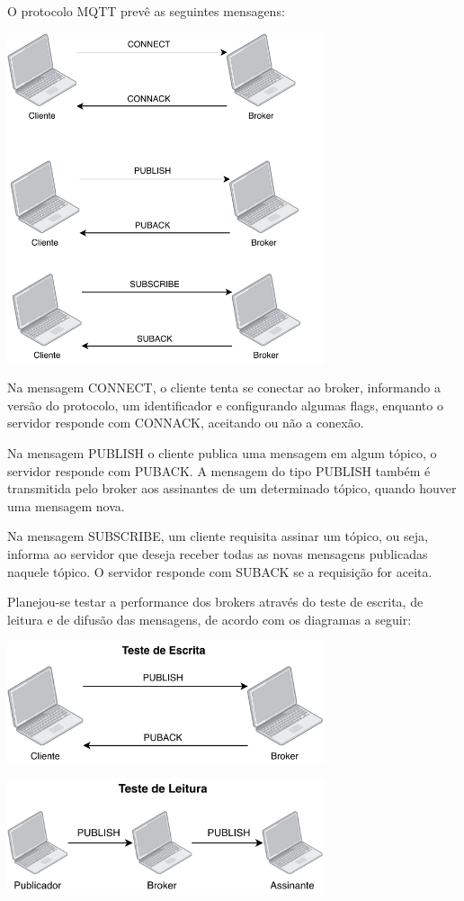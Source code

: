 \documentclass[12pt,a4paper]{article}
\begin{document}
O protocolo MQTT prevê as seguintes mensagens:
\begin{center}
\includegraphics[width=0.7\textwidth]{mqtt}
\end{center}

Na mensagem CONNECT, o cliente tenta se conectar ao broker, informando a versão do protocolo, um identificador e configurando algumas flags, enquanto o servidor responde com CONNACK, aceitando ou não a conexão.

Na mensagem PUBLISH o cliente publica uma mensagem em algum tópico, o servidor responde com PUBACK. A mensagem do tipo PUBLISH também é transmitida pelo broker aos assinantes de um determinado tópico, quando houver uma mensagem nova.

Na mensagem SUBSCRIBE, um cliente requisita assinar um tópico, ou seja, informa ao servidor que deseja receber todas as novas mensagens publicadas naquele tópico. O servidor responde com SUBACK se a requisição for aceita.

Planejou-se testar a performance dos brokers através do teste de escrita, de leitura e de difusão das mensagens, de acordo com os diagramas a seguir:

\begin{center}
\includegraphics[width=0.7\textwidth]{write}
\end{center}
\begin{center}
\includegraphics[width=0.7\textwidth]{read}
\end{center}
\end{document}
